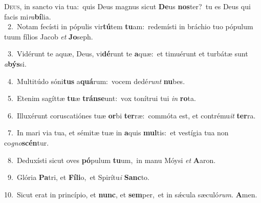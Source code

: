 \lettrine{\initial\textcolor{\initialcolor}{D}}{eus,} in sancto via tua:~\dagger quis Deus magnus sicut \textbf{De}\-us \textbf{nos}\-ter?~\star tu es Deus qui facis mi\-\textit{ra}\-\textbf{bí}lia.\\
{\numbfont\textcolor{\numbcolor}{~2.}}~Notam fecísti in pópulis vir\-\textbf{tú}\-tem \textbf{tu}\-am:~\star redemísti in bráchio tuo pópulum tuum fílios Jacob \textit{et} \textbf{Jo}\-seph.\par
{\numbfont\textcolor{\numbcolor}{~3.}}~Vidérunt te aquæ, Deus, vi\-\textbf{dé}\-runt te \textbf{a}\-quæ:~\star et timuérunt et turbátæ sunt \textit{a}\-\textbf{býs}si.\par
{\numbfont\textcolor{\numbcolor}{~4.}}~Multitúdo sóni\textbf{tus} a\-\textbf{quá}\-rum:~\star vocem dedé\textit{runt} \textbf{nu}\-bes.\par
{\numbfont\textcolor{\numbcolor}{~5.}}~Etenim sagíttæ \textbf{tu}\-æ \textbf{tráns}\-\textbf{e}unt:~\star vox tonítrui tui \textit{in} \textbf{ro}\-ta.\par
{\numbfont\textcolor{\numbcolor}{~6.}}~Illuxérunt coruscatiónes tuæ \textbf{or}\-bi \textbf{ter}\-ræ:~\star commóta est, et contrému\textit{it} \textbf{ter}\-ra.\par
{\numbfont\textcolor{\numbcolor}{~7.}}~In mari via tua, et sémitæ tuæ in \textbf{a}\-quis \textbf{mul}\-tis:~\star et vestígia tua non co\-\textit{gno}\-\textbf{scén}tur.\par
{\numbfont\textcolor{\numbcolor}{~8.}}~Deduxísti sicut oves \textbf{pó}\-pulum \textbf{tu}\-um,~\star in manu Móysi \textit{et} \textbf{A}\-aron.\par
{\numbfont\textcolor{\numbcolor}{~9.}}~Glória \textbf{Pa}\-tri, et \textbf{Fí}\-\textbf{li}o,~\star et Spirítu\textit{i} \textbf{Sanc}\-to.\par
{\numbfont\textcolor{\numbcolor}{10.}}~Sicut erat in princípio, et \textbf{nunc}\-, et \textbf{sem}\-per,~\star et in sǽcula sæculó\-\textit{rum}\-. \textbf{A}\-men.\par
